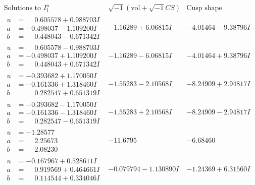 \documentclass[1p]{elsarticle_modified}
\theoremstyle{definition}
\newcommand{\I}{\sqrt{-1}}
\begin{document}
$$\begin{array}{c|c|c}  
\text{Solutions to }I^u_{1}& \I (\text{vol} + \sqrt{-1}CS) & \text{Cusp shape}\\
 \hline 
\begin{aligned}
u &= \phantom{-}0.605578 + 0.988703 I \\
a &= -0.498037 - 1.109200 I \\
b &= \phantom{-}0.448043 - 0.671342 I\end{aligned}
 & -1.16289 + 6.06815 I & -4.01464 - 9.38796 I \\ \hline\begin{aligned}
u &= \phantom{-}0.605578 - 0.988703 I \\
a &= -0.498037 + 1.109200 I \\
b &= \phantom{-}0.448043 + 0.671342 I\end{aligned}
 & -1.16289 - 6.06815 I & -4.01464 + 9.38796 I \\ \hline\begin{aligned}
u &= -0.393682 + 1.170050 I \\
a &= -0.161336 + 1.318460 I \\
b &= \phantom{-}0.282547 + 0.651319 I\end{aligned}
 & -1.55283 - 2.10568 I & -8.24909 + 2.94817 I \\ \hline\begin{aligned}
u &= -0.393682 - 1.170050 I \\
a &= -0.161336 - 1.318460 I \\
b &= \phantom{-}0.282547 - 0.651319 I\end{aligned}
 & -1.55283 + 2.10568 I & -8.24909 - 2.94817 I \\ \hline\begin{aligned}
u &= -1.28577\phantom{ +0.000000I} \\
a &= \phantom{-}2.25673\phantom{ +0.000000I} \\
b &= \phantom{-}2.08230\phantom{ +0.000000I}\end{aligned}
 & -11.6795\phantom{ +0.000000I} & -6.68460\phantom{ +0.000000I} \\ \hline\begin{aligned}
u &= -0.167967 + 0.528611 I \\
a &= \phantom{-}0.919569 + 0.464661 I \\
b &= \phantom{-}0.114544 + 0.334046 I\end{aligned}
 & -0.079794 - 1.130890 I & -1.24369 + 6.31560 I \\ \hline\begin{aligned}

\end{aligned}
\end{array}$$
\end{document}
